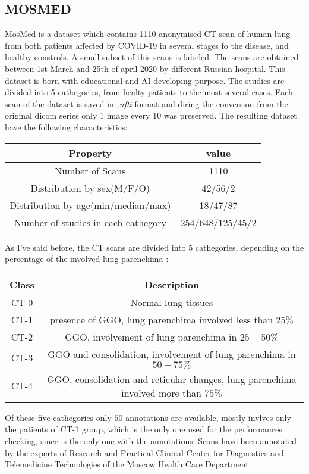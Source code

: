 \documentclass{standalone}
\begin{document}
	\subsection{MOSMED}
	
	MosMed is a dataset which contains 1110 anonymised CT scan of human lung from both patients affected by COVID-19 in several stages fo the disease, and healthy constrols. A small subset of this scans is labeled. The scans are obtained between 1st March and 25th of april 2020 by different Russian hospital. This dataset is born with educational and AI developing purpose. The studies are divided into 5 cathegories, from healty patients to the most several cases. Each scan of the dataset is saved in \emph{.nfti} format and diring the conversion from the original dicom series only 1 image every 10 was preserved.
	The resulting dataset have the following characteristics: 
	
	\begin{table}[h!]
		\centering
		\begin{tabular}{|c|c|}
			\hline
			\textbf{Property} 		   				   & \textbf{value}	  \\ \hline
			Number of Scans 		   				   & 1110             \\ 
			Distribution by sex(M/F/O) 				   & 42/56/2          \\
			Distribution by age(min/median/max)		   & 18/47/87         \\
			Number of studies in each cathegory		   & 254/648/125/45/2 \\ \hline
			
		\end{tabular}
	\end{table}

	As I've said before, the CT scans are divided into 5 cathegories, depending on the percentage of the involved lung parenchima : 
	\begin{table}[h!]
		\centering
		\begin{tabular}{|c|c|}
			\hline
			\textbf{Class} & \textbf{Description} \\ \hline
			CT-0		   & Normal  lung tissues \\
			CT-1		   & presence of GGO, lung parenchima involved less than $25\%$ \\
			CT-2		   & GGO, involvement of lung parenchima in $25 - 50\%$ \\
			CT-3		   & GGO and consolidation, involvement of lung parenchima in $50 - 75\%$ \\
			CT-4		   & GGO, consolidation and reticular changes, lung parenchima involved more than $75\%$\\ \hline
		\end{tabular}
	\end{table}

	Of these five cathegories only $50$ annotations are available, mostly invlves only the patients of CT-1 group, which is the only one used for the 
	performances checking, since is the only one with the annotations. Scans have been annotated by the experts of Research and Practical Clinical Center for Diagnostics and Telemedicine Technologies of the Moscow Health Care Department.
\end{document}
